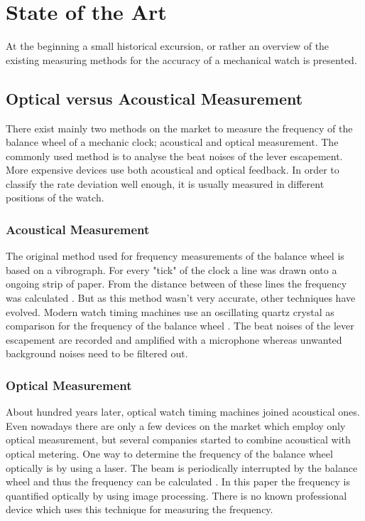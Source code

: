 \documentclass[12pt, a4paper]{report}
\begin{document}
    \section{State of the Art}
    At the beginning a small historical excursion, or rather an overview of the existing measuring methods for the accuracy of a mechanical watch is presented.
     \subsection{Optical versus Acoustical Measurement}
    There exist mainly two methods on the market to measure the frequency of the balance wheel of a mechanic clock; acoustical and optical measurement. The commonly used method is to analyse the beat noises of the lever escapement. More expensive devices use both acoustical and optical feedback. In order to classify the rate deviation well enough, it is usually measured in different positions of the watch.
    
    \subsubsection{Acoustical Measurement}
    The original method used for frequency measurements of the balance wheel is based on a vibrograph. For every "tick" of the clock a line was drawn onto a ongoing strip of paper. From the distance between of these lines the frequency was calculated \cite{Zeitwaage}. But as this method wasn't very accurate, other techniques have evolved.  
    Modern watch timing machines use an oscillating quartz crystal as comparison for the frequency of the balance wheel \cite{Zeitwaage}. The beat noises of the lever escapement are recorded and amplified with a microphone whereas unwanted background noises need to be filtered out. 
    
    \subsubsection{Optical Measurement}
    About hundred years later, optical watch timing machines joined acoustical ones. Even nowadays there are only a few devices on the market which employ only optical measurement, but several companies started to combine acoustical with optical metering. One way to determine the frequency of the balance wheel optically is by using a laser. The beam is periodically interrupted by the balance wheel and thus the frequency can be calculated \cite{Lombardi2011}. In this paper the frequency is quantified optically by using image processing. There is no known professional device which uses this technique for measuring the frequency.
    
\end{document}
